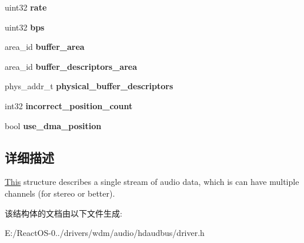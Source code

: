 \begin{DoxyCompactItemize}
\item 
\mbox{\label{structhda__stream_aa188f2af04282c2ae9b2a23787597d61}} 
uint32 {\bfseries rate}
\item 
\mbox{\label{structhda__stream_a11b6b1e00a53f9058b483ba7daf0a15e}} 
uint32 {\bfseries bps}
\item 
\mbox{\label{structhda__stream_a36ef69007f3f183c1f4356cfd477d9c8}} 
area\+\_\+id {\bfseries buffer\+\_\+area}
\item 
\mbox{\label{structhda__stream_a59f0b75dead0ec9b5659f4d96c2a7b48}} 
area\+\_\+id {\bfseries buffer\+\_\+descriptors\+\_\+area}
\item 
\mbox{\label{structhda__stream_a78849979d0002f41fb7c5ce528e26a69}} 
phys\+\_\+addr\+\_\+t {\bfseries physical\+\_\+buffer\+\_\+descriptors}
\item 
\mbox{\label{structhda__stream_aeb3f74963fb08a753ea502aa791ee362}} 
int32 {\bfseries incorrect\+\_\+position\+\_\+count}
\item 
\mbox{\label{structhda__stream_a1fed75557d70b4cf8a0d984e1df977e5}} 
bool {\bfseries use\+\_\+dma\+\_\+position}
\end{DoxyCompactItemize}


\subsection{详细描述}
\hyperlink{namespace_this}{This} structure describes a single stream of audio data, which is can have multiple channels (for stereo or better). 

该结构体的文档由以下文件生成\+:\begin{DoxyCompactItemize}
\item 
E\+:/\+React\+O\+S-\/0../drivers/wdm/audio/hdaudbus/driver.\+h\end{DoxyCompactItemize}
